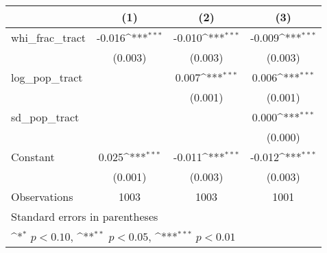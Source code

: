 {
\def\sym#1{\ifmmode^{#1}\else\(^{#1}\)\fi}
\begin{tabular}{l*{3}{c}}
\hline\hline
                    &\multicolumn{1}{c}{(1)}         &\multicolumn{1}{c}{(2)}         &\multicolumn{1}{c}{(3)}         \\
\hline
whi\_frac\_tract      &      -0.016\sym{***}&      -0.010\sym{***}&      -0.009\sym{***}\\
                    &     (0.003)         &     (0.003)         &     (0.003)         \\
[1em]
log\_pop\_tract       &                     &       0.007\sym{***}&       0.006\sym{***}\\
                    &                     &     (0.001)         &     (0.001)         \\
[1em]
sd\_pop\_tract        &                     &                     &       0.000\sym{***}\\
                    &                     &                     &     (0.000)         \\
[1em]
Constant            &       0.025\sym{***}&      -0.011\sym{***}&      -0.012\sym{***}\\
                    &     (0.001)         &     (0.003)         &     (0.003)         \\
\hline
Observations        &        1003         &        1003         &        1001         \\
\hline\hline
\multicolumn{4}{l}{\footnotesize Standard errors in parentheses}\\
\multicolumn{4}{l}{\footnotesize \sym{*} \(p<0.10\), \sym{**} \(p<0.05\), \sym{***} \(p<0.01\)}\\
\end{tabular}
}
